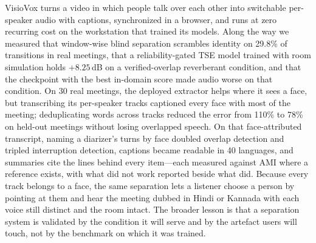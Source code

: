 \documentclass[conference]{IEEEtran}
\newcommand{\dB}{\,dB\xspace}
\begin{document}
VisioVox turns a video in which people talk over each other into switchable per-speaker audio with captions, synchronized in a browser, and runs at zero recurring cost on the workstation that trained its models. Along the way we measured that window-wise blind separation scrambles identity on 29.8\% of transitions in real meetings, that a reliability-gated TSE model trained with room simulation holds $+8.25$\dB on a verified-overlap reverberant condition, and that the checkpoint with the best in-domain score made audio worse on that condition. On 30 real meetings, the deployed extractor helps where it sees a face, but transcribing its per-speaker tracks captioned every face with most of the meeting; deduplicating words across tracks reduced the error from 110\% to 78\% on held-out meetings without losing overlapped speech. On that face-attributed transcript, naming a diarizer's turns by face doubled overlap detection and tripled interruption detection, captions became readable in 40 languages, and summaries cite the lines behind every item---each measured against AMI where a reference exists, with what did not work reported beside what did. Because every track belongs to a face, the same separation lets a listener choose a person by pointing at them and hear the meeting dubbed in Hindi or Kannada with each voice still distinct and the room intact. The broader lesson is that a separation system is validated by the condition it will serve and by the artefact users will touch, not by the benchmark on which it was trained.



\end{document}
